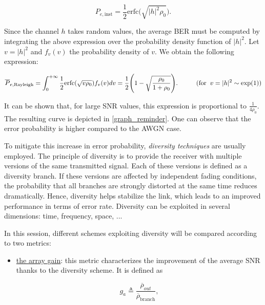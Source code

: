 \documentclass [a4paper, 11pt] {article}
\begin{document}
\begin{reminder}
    \begin{equation}
        P_{e,\text{inst}}= \frac{1}{2}\text{erfc}\big(\sqrt{|h|^2 \rho_0}\big).
    \end{equation}


    Since the channel $h$ takes random values, the average BER must be computed by integrating the above expression over the probability density function of $|h|^2$. Let $v = |h|^2$ and $f_v(v)$ the probability density of $v$. We obtain the following expression:


    \begin{equation}
        \overline{P}_{e,\text{Rayleigh}}= \int^{+\infty}_{0}\frac{1}{2}\text{erfc}(\sqrt{v \rho_0}) f_v(v) dv = \frac{1}{2} \Bigg(1 - \sqrt{\frac{\rho_0}{1+\rho_0}}\Bigg). \hspace{1 cm} (\text{for} \; \; v = |h|^2 \sim \exp(1))
    \end{equation}

    It can be shown that, for large SNR values, this expression is proportional to $\frac{1}{4\rho_0}$. The resulting curve is depicted in \autoref{graph_reminder}. One can observe that the error probability is higher compared to the AWGN case.


    To mitigate this increase in error probability, \textit{diversity techniques} are usually employed. The principle of diversity is to provide the receiver with multiple versions of the same transmitted signal. Each of these versions is defined as a diversity branch. If these versions are affected by independent fading conditions, the probability that all branches are strongly distorted at the same time reduces dramatically. Hence, diversity helps stabilize the link, which leads to an improved performance in terms of error rate. Diversity can be exploited in several dimensions: time, frequency, space, ...


    In this session, different schemes exploiting diversity will be compared according to two metrics:

    \begin{itemize}
        \item \underline{the array gain}: this metric characterizes the improvement of the average SNR thanks to the diversity scheme. It is defined as

        \begin{equation}
        g_a \triangleq \frac{\overline{\rho}_{out}}{\overline{\rho}_{\text{branch}}},
        \end{equation}


\end{itemize}
\end{reminder}
\end{document}

